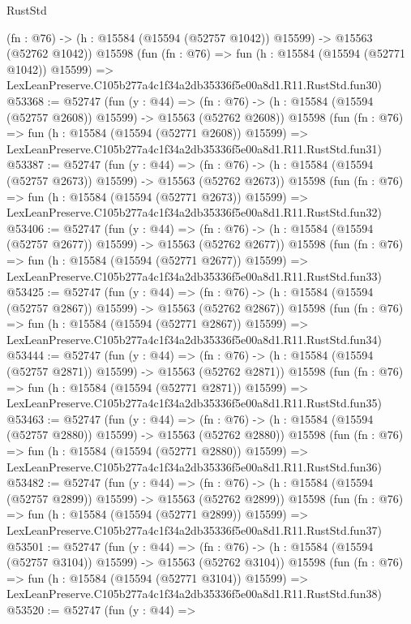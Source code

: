 \begin{lexlean}{RustStd}
\begin{coremodule}
    (fn : @76) -> (h : @15584 (@15594 (@52757 @1042)) @15599) -> @15563 (@52762 @1042))
    @15598
    (fun (fn : @76) =>
    fun (h : @15584 (@15594 (@52771 @1042)) @15599) =>
    LexLeanPreserve.C105b277a4c1f34a2db35336f5e00a8d1.R11.RustStd.fun30)
@53368 := @52747
    (fun (y : @44) =>
    (fn : @76) -> (h : @15584 (@15594 (@52757 @2608)) @15599) -> @15563 (@52762 @2608))
    @15598
    (fun (fn : @76) =>
    fun (h : @15584 (@15594 (@52771 @2608)) @15599) =>
    LexLeanPreserve.C105b277a4c1f34a2db35336f5e00a8d1.R11.RustStd.fun31)
@53387 := @52747
    (fun (y : @44) =>
    (fn : @76) -> (h : @15584 (@15594 (@52757 @2673)) @15599) -> @15563 (@52762 @2673))
    @15598
    (fun (fn : @76) =>
    fun (h : @15584 (@15594 (@52771 @2673)) @15599) =>
    LexLeanPreserve.C105b277a4c1f34a2db35336f5e00a8d1.R11.RustStd.fun32)
@53406 := @52747
    (fun (y : @44) =>
    (fn : @76) -> (h : @15584 (@15594 (@52757 @2677)) @15599) -> @15563 (@52762 @2677))
    @15598
    (fun (fn : @76) =>
    fun (h : @15584 (@15594 (@52771 @2677)) @15599) =>
    LexLeanPreserve.C105b277a4c1f34a2db35336f5e00a8d1.R11.RustStd.fun33)
@53425 := @52747
    (fun (y : @44) =>
    (fn : @76) -> (h : @15584 (@15594 (@52757 @2867)) @15599) -> @15563 (@52762 @2867))
    @15598
    (fun (fn : @76) =>
    fun (h : @15584 (@15594 (@52771 @2867)) @15599) =>
    LexLeanPreserve.C105b277a4c1f34a2db35336f5e00a8d1.R11.RustStd.fun34)
@53444 := @52747
    (fun (y : @44) =>
    (fn : @76) -> (h : @15584 (@15594 (@52757 @2871)) @15599) -> @15563 (@52762 @2871))
    @15598
    (fun (fn : @76) =>
    fun (h : @15584 (@15594 (@52771 @2871)) @15599) =>
    LexLeanPreserve.C105b277a4c1f34a2db35336f5e00a8d1.R11.RustStd.fun35)
@53463 := @52747
    (fun (y : @44) =>
    (fn : @76) -> (h : @15584 (@15594 (@52757 @2880)) @15599) -> @15563 (@52762 @2880))
    @15598
    (fun (fn : @76) =>
    fun (h : @15584 (@15594 (@52771 @2880)) @15599) =>
    LexLeanPreserve.C105b277a4c1f34a2db35336f5e00a8d1.R11.RustStd.fun36)
@53482 := @52747
    (fun (y : @44) =>
    (fn : @76) -> (h : @15584 (@15594 (@52757 @2899)) @15599) -> @15563 (@52762 @2899))
    @15598
    (fun (fn : @76) =>
    fun (h : @15584 (@15594 (@52771 @2899)) @15599) =>
    LexLeanPreserve.C105b277a4c1f34a2db35336f5e00a8d1.R11.RustStd.fun37)
@53501 := @52747
    (fun (y : @44) =>
    (fn : @76) -> (h : @15584 (@15594 (@52757 @3104)) @15599) -> @15563 (@52762 @3104))
    @15598
    (fun (fn : @76) =>
    fun (h : @15584 (@15594 (@52771 @3104)) @15599) =>
    LexLeanPreserve.C105b277a4c1f34a2db35336f5e00a8d1.R11.RustStd.fun38)
@53520 := @52747
    (fun (y : @44) =>

\end{coremodule}
\end{lexlean}

